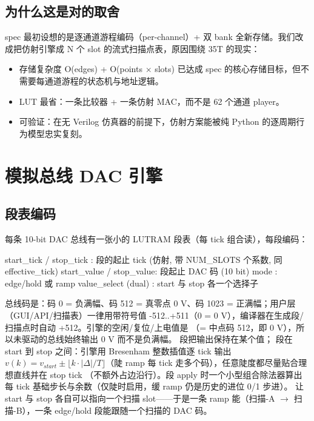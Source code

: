 \documentclass[11pt,oneside,openany]{book}
\begin{document}
\section{为什么这是对的取舍}
spec 最初设想的是逐通道游程编码（per-channel）+ 双 bank 全新存储。我们改成把仿射引擎成 N 个 slot 的流式扫描点表，原因围绕 35T 的现实：
\begin{itemize}
  \item 存储复杂度 O(edges) + O(points $\times$ slots) 已达成 spec 的核心存储目标，但不需要每通道游程的状态机与地址逻辑。
  \item LUT 最省：一条比较器 + 一条仿射 MAC，而不是 62 个通道 player。
  \item 可验证：在无 Verilog 仿真器的前提下，仿射方案能被纯 Python 的逐周期行为模型忠实复刻。
\end{itemize}

\chapter{模拟总线 DAC 引擎}

\section{段表编码}
每条 10-bit DAC 总线有一张小的 LUTRAM 段表（每 tick 组合读），每段编码：

\begin{codeblock}
start_tick / stop_tick : 段的起止 tick (仿射, 带 NUM_SLOTS 个系数, 同 effective_tick)
start_value / stop_value: 段起止 DAC 码 (10 bit)
mode                    : edge/hold 或 ramp
value_select (dual)     : start 与 stop 各一个选择子
\end{codeblock}

总线码是：码 0 = 负满幅、码 512 = 真零点 0 V、码 1023 = 正满幅；用户层（GUI/API/扫描表）一律用带符号值 -512..+511（0 = 0 V），编译器在生成段/扫描点时自动 +512。引擎的空闲/复位/上电值是 （= 中点码 512，即 0 V），所以未驱动的总线始终输出 0 V 而不是负满幅。 段把输出保持在某个值； 段在 start 到 stop 之间：引擎用 Bresenham 整数插值逐 tick 输出 $v(k)=v_{start}\pm\lfloor k\cdot|\Delta|/T\rfloor$（陡 ramp 每 tick 走多个码），任意陡度都尽量贴合理想直线并在 stop tick （不额外占边沿行）。段 apply 时一个小型组合除法器算出每 tick 基础步长与余数（仅陡时启用，缓 ramp 仍是历史的进位 0/1 步进）。 让 start 与 stop 各自可以指向一个扫描 slot——于是一条 ramp 能（扫描-A $\rightarrow$ 扫描-B），一条 edge/hold 段能跟随一个扫描的 DAC 码。
\end{document}

